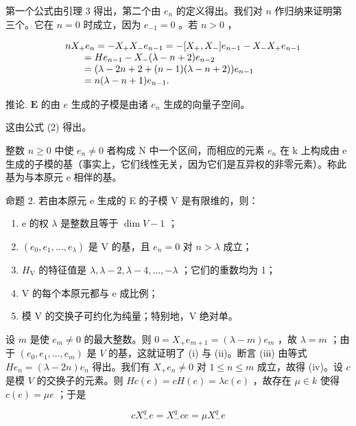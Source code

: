 第一个公式由引理 3 得出，第二个由 \(e_n\) 的定义得出。我们对 \(n\) 作归纳来证明第三个。它在 \(n = 0\) 时成立，因为 \(e_{-1} = 0\) 。若 \(n > 0\) ，

\[
\begin{array}{r l} & n X _ {+} e _ {n} = - X _ {+} X _ {-} e _ {n - 1} = - [ X _ {+}, X _ {-} ] e _ {n - 1} - X _ {-} X _ {+} e _ {n - 1} \\ & \qquad = H e _ {n - 1} - X _ {-} (\lambda - n + 2) e _ {n - 2} \\ & \qquad = (\lambda - 2 n + 2 + (n - 1) (\lambda - n + 2)) e _ {n - 1} \\ & \qquad = n (\lambda - n + 1) e _ {n - 1}. \end{array}
\]

推论. \(\mathbf{E}\) 的由 \(e\) 生成的子模是由诸 \(e_n\) 生成的向量子空间。

这由公式 (2) 得出。

整数 \(n \geq 0\) 中使 \(e_{n} \neq 0\) 者构成 N 中一个区间，而相应的元素 \(e_{n}\) 在 k 上构成由 e 生成的子模的基（事实上，它们线性无关，因为它们是互异权的非零元素）。称此基为与本原元 e 相伴的基。

命题 2. 若由本原元 e 生成的 E 的子模 V 是有限维的，则：

\begin{enumerate}
\def\labelenumi{(\roman{enumi})}
\item
  e 的权 \(\lambda\) 是整数且等于 \(\dim V - 1\) ；
\item
  \((e_0, e_1, \ldots, e_\lambda)\) 是 V 的基，且 \(e_n = 0\) 对 \(n > \lambda\) 成立；
\item
  \(H_{\mathrm{V}}\) 的特征值是 \(\lambda, \lambda - 2, \lambda - 4, \ldots, -\lambda\) ；它们的重数均为 1；
\item
  V 的每个本原元都与 e 成比例；
\item
  模 \(\mathrm{V}\) 的交换子可约化为纯量；特别地，\(\mathrm{V}\) 绝对单。
\end{enumerate}

设 \(m\) 是使 \(e_m \neq 0\) 的最大整数。则 \(0 = X_{+}e_{m+1} = (\lambda - m)e_m\) ，故 \(\lambda = m\) ；由于 \((e_0, e_1, \ldots, e_m)\) 是 \(V\) 的基，这就证明了 (i) 与 (ii)。断言 (iii) 由等式 \(He_n = (\lambda - 2n)e_n\) 得出。我们有 \(X_{+}e_n \neq 0\) 对 \(1 \leq n \leq m\) 成立，故得 (iv)。设 \(c\) 是模 \(V\) 的交换子的元素。则 \(Hc(e) = cH(e) = \lambda c(e)\) ，故存在 \(\mu \in k\) 使得 \(c(e) = \mu e\) ；于是

\[
c X _ {-} ^ {q} e = X _ {-} ^ {q} c e = \mu X _ {-} ^ {q} e
\]

